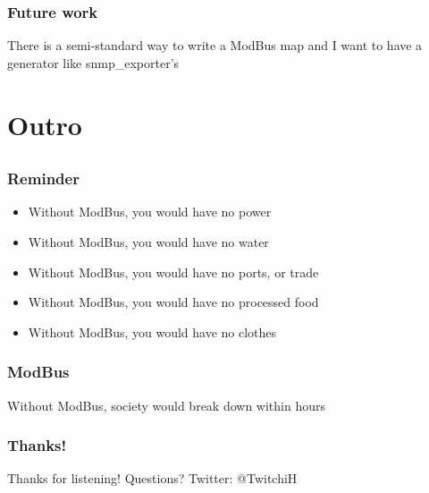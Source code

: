 \documentclass[aspectratio=169]{beamer}
\begin{document}
\begin{frame}
	\frametitle{Future work}
	\centering
	\vfill
	There is a semi-standard way to write a ModBus map and I want to have a generator like snmp\_exporter's
	\vfill
\end{frame}



\section{Outro}


\subsection{}

\begin{frame}
	\frametitle{Reminder}
	\begin{itemize}
		\item Without ModBus, you would have no power
		\item Without ModBus, you would have no water
		\item Without ModBus, you would have no ports, or trade
		\item Without ModBus, you would have no processed food
		\item Without ModBus, you would have no clothes
	\end{itemize}
\end{frame}

\begin{frame}
	\frametitle{ModBus}
	\centering
	\vfill
	Without ModBus, society would break down within hours
	\vfill
\end{frame}

\begin{frame}
	\frametitle{Thanks!}
		\begin{center}
			\vfill
			Thanks for listening!
			\vfill
			Questions?
			\vfill
			Twitter: @TwitchiH
			\vfill
		\end{center}
\end{frame}
\end{document}
